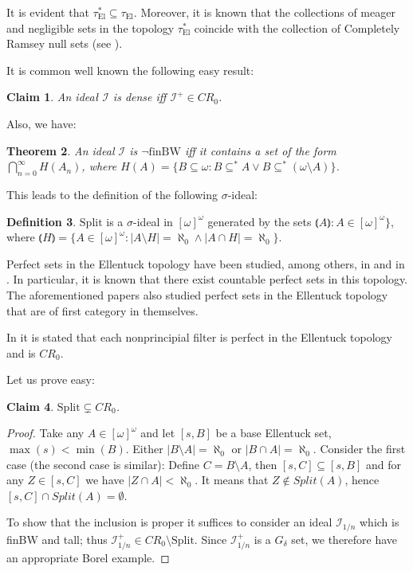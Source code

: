 \documentclass[12pt]{amsart}
\theoremstyle{plain}
\newtheorem{theorem}{Theorem}[section]
\newtheorem{claim}[theorem]{Claim}
\theoremstyle{definition}
\newtheorem{definition}[theorem]{Definition}
\theoremstyle{remark}
\newcommand{\infsub}{[\omega]^{\omega}}
\newcommand{\calI}{\mathcal{I}}
\newcommand{\cI}{\mathcal{I}}
\newcommand{\idealHarmonicznyVar}{\cI_{1/n}}
\newcommand{\EllentuckTopology}{\tau_\mathrm{El}}
\newcommand{\EllentuckTopologyStar}{\EllentuckTopology^*}
\newcommand{\Split}{\mathrm{Split}}
\newcommand{\lNawiasik}{\lParen}
\newcommand{\rNawiasik}{\rParen}
\newcommand{\notfinBW}{\neg \mathrm{finBW}}
\begin{document}
It is evident that $\EllentuckTopologyStar \subseteq \EllentuckTopology$.
Moreover, it is known that the collections of meager and negligible
sets in the topology $\EllentuckTopologyStar$
coincide with the collection of Completely Ramsey null sets
(see \cite{Plewik1987}).

It is common well known the following easy result:
\begin{claim}
An ideał $\calI$ is dense iff $\calI^+ \in CR_0$.
\end{claim}

Also, we have: 
\begin{theorem}
  An ideal $\calI$ is $\notfinBW$ iff it contains a set of the form
  \linebreak
$\bigcap_{n=0}^\infty H(A_n)$, where
 $H(A) = \lbrace B \subseteq \omega \colon B \subseteq^* A \vee B \subseteq^* (\omega\setminus A)\rbrace$.
\end{theorem}

This leads to the definition of the following $\sigma$-ideal:

\begin{definition}
$\mathrm{Split}$ is a $\sigma$-ideal in
$\infsub$ generated by the sets
  \linebreak $\lNawiasik A \rNawiasik \colon A \in \infsub \rbrace$,
where  
$\lNawiasik H \rNawiasik = 
\lbrace A \in \infsub \colon |A \setminus H| = \aleph_0 \wedge |A \cap H| = \aleph_0\rbrace$.
\end{definition}

Perfect sets in the Ellentuck topology have been studied,
among others, in \cite{Reardon1996} and in \cite{NowikReardon2003}.
In particular, it is known that there exist countable perfect sets in this topology.
The aforementioned papers also studied perfect sets in the Ellentuck topology
that are of first category in themselves.

In \cite{NowikReardon2003} it is stated that each nonprincipial filter is
perfect in the Ellentuck topology and is $CR_0$.

Let us prove easy:
\begin{claim}
  $\Split\subsetneq CR_0$.
\end{claim}
\begin{proof}
  Take any $A \in \infsub$ and let $[s, B]$ be a base Ellentuck set, $\max(s) < \min(B)$.
Either $|B \setminus A| = \aleph_0$ or $|B \cap A| = \aleph_0$.
Consider the first case (the second case is similar): Define $C = B \setminus A$, 
then $[s, C] \subseteq [s, B]$ and for any $Z \in [s, C]$ we have
$|Z \cap A| < \aleph_0$. It means that
$Z \not\in \mathit{Split}(A)$, hence $[s, C] \cap \mathit{Split}(A) = \emptyset$.

To show that the inclusion is proper it suffices to consider an ideal 
$\idealHarmonicznyVar$ which is finBW and tall; thus 
$\idealHarmonicznyVar^+ \in CR_0 \setminus \mathrm{Split}$. Since 
$\idealHarmonicznyVar^+$ is a $G_\delta$ set, we therefore have an appropriate Borel example.
\end{proof}
\end{document}
